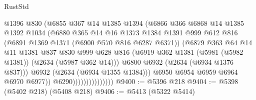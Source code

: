 \begin{lexlean}{RustStd}
\begin{coremodule}
                                  @1396
                                  @830
                                  (@6855
                                    @367
                                    @14
                                    @1385
                                    @1394
                                    (@6866
                                      @366
                                      @6868
                                      @14
                                      @1385
                                      @1392
                                      @1034
                                      (@6880
                                        @365
                                        @14
                                        @16
                                        @1373
                                        @1384
                                        @1391
                                        @999
                                        @612
                                        @816
                                        (@6891 @1369 @1371 (@6900 @570 @816 @6287 @6371))
                                        (@6879
                                          @363
                                          @64
                                          @14
                                          @11
                                          @1381
                                          @837
                                          @830
                                          @999
                                          @628
                                          @816
                                          (@6919
                                            @362
                                            @1381
                                            (@5981 (@5982 @1381))
                                            (@2634 (@5987 @362 @14)))
                                          @6800
                                          @6932
                                          (@2634 (@6934 @1376 @837)))
                                        @6932
                                        (@2634 (@6934 @1355 @1384)))
                                      @6950
                                      @6954
                                      @6959
                                      @6964
                                      @6970
                                      @6977))
                                  @6290)))))))))))))))
@9400 := @5396 @218
@9404 := @5398 (@5402 @218) (@5408 @218)
@9406 := @5413 (@5322 @5414)

\end{coremodule}
\end{lexlean}
